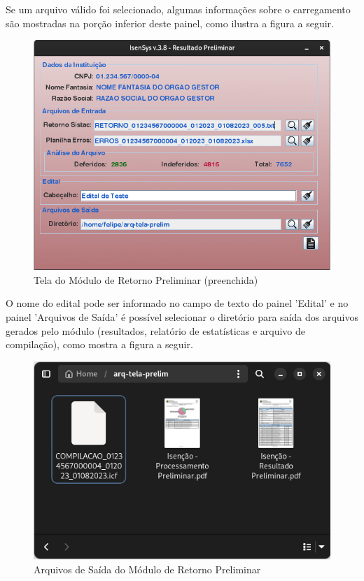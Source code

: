 \documentclass[
	12pt,			%
	openright,		%
	oneside,	
	a4paper,		%
	english,		%
	brazil			%
]{abntex2/abntex2}  %
\begin{document}
					Se um arquivo válido foi selecionado, algumas informações sobre o carregamento são mostradas na porção inferior deste painel, como ilustra a figura a seguir.
		
					\begin{figure}[ht]
						\begin{center}
							
							\caption{Tela do Módulo de Retorno Preliminar (preenchida)}
							\includegraphics[scale=0.45]{img/retorno-prelim-ui-processed}
							
						\end{center}
					\end{figure}
		
					O nome do edital pode ser informado no campo de texto do painel 'Edital' e no painel 'Arquivos de Saída' é possível selecionar o diretório para saída dos arquivos gerados pelo módulo (resultados, relatório de estatísticas e arquivo de compilação), como mostra a figura a seguir.
		
					\begin{figure}[!ht]
						\begin{center}
							
							\caption{Arquivos de Saída do Módulo de Retorno Preliminar}
							\includegraphics[scale=0.45]{img/retorno-prelim-files}
							
						\end{center}
					\end{figure}
		
\end{document}
